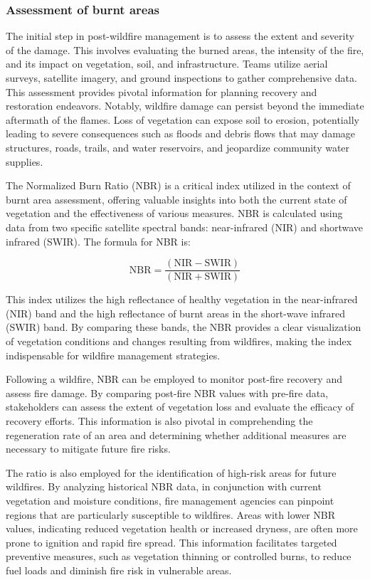 \documentclass[
  12 pt,
]{Nemilov}
\begin{document}
\subsubsection{Assessment of burnt areas}\label{assessment-of-burnt-areas}

The initial step in post-wildfire management is to assess the extent and severity of the damage. This involves evaluating the burned areas, the intensity of the fire, and its impact on vegetation, soil, and infrastructure. Teams utilize aerial surveys, satellite imagery, and ground inspections to gather comprehensive data. This assessment provides pivotal information for planning recovery and restoration endeavors. Notably, wildfire damage can persist beyond the immediate aftermath of the flames. Loss of vegetation can expose soil to erosion, potentially leading to severe consequences such as floods and debris flows that may damage structures, roads, trails, and water reservoirs, and jeopardize community water supplies.

The Normalized Burn Ratio (NBR) is a critical index utilized in the context of burnt area assessment, offering valuable insights into both the current state of vegetation and the effectiveness of various measures. NBR is calculated using data from two specific satellite spectral bands: near-infrared (NIR) and shortwave infrared (SWIR). The formula for NBR is:

\[ \text{NBR} = \frac{(\text{NIR} - \text{SWIR})}{(\text{NIR} + \text{SWIR})} \]

This index utilizes the high reflectance of healthy vegetation in the near-infrared (NIR) band and the high reflectance of burnt areas in the short-wave infrared (SWIR) band. By comparing these bands, the NBR provides a clear visualization of vegetation conditions and changes resulting from wildfires, making the index indispensable for wildfire management strategies.

Following a wildfire, NBR can be employed to monitor post-fire recovery and assess fire damage. By comparing post-fire NBR values with pre-fire data, stakeholders can assess the extent of vegetation loss and evaluate the efficacy of recovery efforts. This information is also pivotal in comprehending the regeneration rate of an area and determining whether additional measures are necessary to mitigate future fire risks.

The ratio is also employed for the identification of high-risk areas for future wildfires. By analyzing historical NBR data, in conjunction with current vegetation and moisture conditions, fire management agencies can pinpoint regions that are particularly susceptible to wildfires. Areas with lower NBR values, indicating reduced vegetation health or increased dryness, are often more prone to ignition and rapid fire spread. This information facilitates targeted preventive measures, such as vegetation thinning or controlled burns, to reduce fuel loads and diminish fire risk in vulnerable areas.
\end{document}
